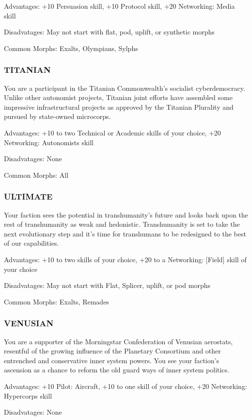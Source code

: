 Advantages: +10 Persuasion skill, +10 Protocol skill, +20 Networking: Media
skill

Disadvatages: May not start with flat, pod, uplift, or synthetic morphs

Common Morphs: Exalts, Olympians, Sylphs

\subsubsection{TITANIAN}
You are a participant in the Titanian Commonwealth’s socialist
cyberdemocracy. Unlike other autonomist projects, Titanian joint efforts have
assembled some impressive infrastructural projects as approved by the Titanian
Plurality and pursued by state-owned microcorps.

Advantages: +10 to two Technical or Academic skills of your choice, +20
Networking: Autonomists skill

Disadvatages: None

Common Morphs: All

\subsubsection{ULTIMATE}
Your faction sees the potential in transhumanity’s future and looks back upon
the rest of transhumanity as weak and hedonistic. Transhumanity is set to take
the next evolutionary step and it’s time for transhumans to be redesigned to
the best of our capabilities.

Advantages: +10 to two skills of your choice, +20 to a Networking: [Field]
skill of your choice

Disadvatages: May not start with Flat, Splicer, uplift, or pod morphs

Common Morphs: Exalts, Remades

\subsubsection{VENUSIAN}
You are a supporter of the Morningstar Confederation of Venusian aerostats,
resentful of the growing influence of the Planetary Consortium and other
entrenched and conservative inner system powers. You see your faction’s
ascension as a chance to reform the old guard ways of inner system politics.

Advantages: +10 Pilot: Aircraft, +10 to one skill of your choice, +20
Networking: Hypercorps skill

Disadvatages: None

